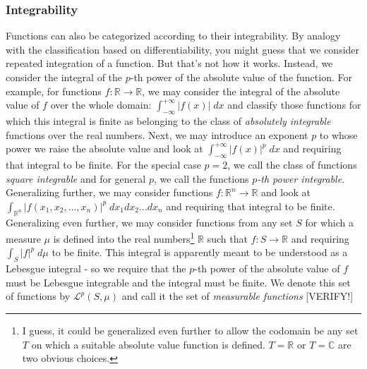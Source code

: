 \subsubsection{Integrability} Functions can also be categorized according to their integrability. By analogy with the classification based on differentiability, you might guess that we consider repeated integration of a function. But that's not how it works. Instead, we consider the integral of the $p$-th power of the absolute value of the function. For example, for functions $f: \mathbb{R} \rightarrow \mathbb{R}$, we may consider the integral of the absolute value of $f$ over the whole domain: $\int_{-\infty}^{+\infty} |f(x)| \; dx$ and classify those functions for which this integral is finite as belonging to the class of \emph{absolutely integrable} functions over the real numbers. Next, we may introduce an exponent $p$ to whose power we raise the absolute value and look at $\int_{-\infty}^{+\infty} |f(x)|^p \; dx$ and requiring that integral to be finite. For the special case $p=2$, we call the class of functions \emph{square integrable} and for general $p$, we call the functions \emph{$p$-th power integrable}. Generalizing further, we may consider functions $f: \mathbb{R}^n \rightarrow \mathbb{R}$ and look at $\int_{\mathbb{R}^n} |f(x_1, x_2,\ldots,x_n)|^p \; dx_1 dx_2 \ldots dx_n$ and requiring that integral to be finite. Generalizing even further, we may consider functions from any set $S$ for which a measure $\mu$ is defined into the real numbers\footnote{I guess, it could be generalized even further to allow the codomain be any set $T$ on which a suitable absolute value function is defined. $T =\mathbb{R}$ or $T = \mathbb{C}$ are two obvious choices.} $\mathbb{R}$ such that $f: S \rightarrow \mathbb{R}$ and requiring $\int_S |f|^p \; d \mu $ to be finite. This integral is apparently meant to be understood as a Lebesgue integral - so we require that the $p$-th power of the absolute value of $f$ must be Lebesgue integrable and the integral must be finite. We denote this set of functions by $\mathcal{L}^p(S,\mu)$ and call it the set of \emph{measurable functions} [VERIFY!]





